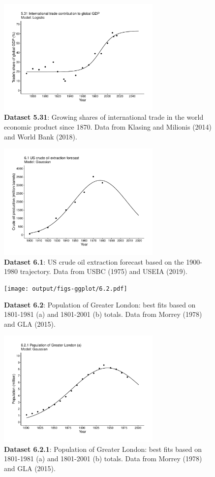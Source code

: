 \documentclass[aps,rmp,preprint,superscriptaddress,10pt,onecolumn]{article}
\begin{document}
\begin{figure}[h]
\includegraphics[width=8cm]{output/figs-ggplot/5.31.pdf}
\caption{\textbf{Dataset 5.31}: Growing shares of international trade in the world economic product since 1870. Data from Klasing and Milionis (2014) and World Bank (2018).}
\end{figure}
	
\begin{figure}[h]
\includegraphics[width=8cm]{output/figs-ggplot/6.1.pdf}
\caption{\textbf{Dataset 6.1}: US crude oil extraction forecast based on the 1900-1980 trajectory. Data from USBC (1975) and USEIA (2019). }
\end{figure}
	
\begin{figure}[h]
\texttt{[image: output/figs-ggplot/6.2.pdf]}
\caption{\textbf{Dataset 6.2}: Population of Greater London: best fits based on 1801-1981 (a) and 1801-2001 (b) totals. Data from Morrey (1978) and GLA (2015). }
\end{figure}
	
\begin{figure}[h]
\includegraphics[width=8cm]{output/figs-ggplot/6.2.1.pdf}
\caption{\textbf{Dataset 6.2.1}: Population of Greater London: best fits based on 1801-1981 (a) and 1801-2001 (b) totals. Data from Morrey (1978) and GLA (2015). }
\end{figure}
	
\end{document}
